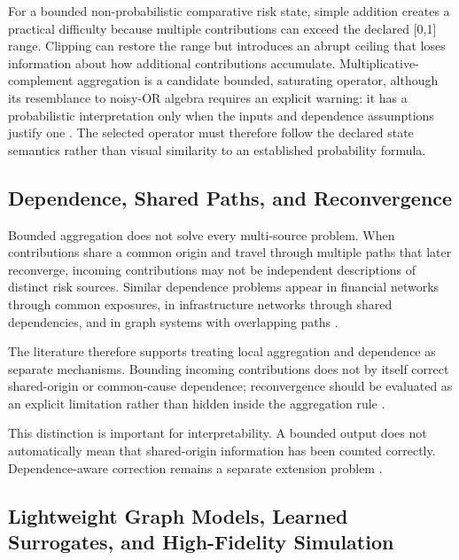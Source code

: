 For a bounded non-probabilistic comparative risk state, simple addition
creates a practical difficulty because multiple contributions can exceed
the declared {[}0,1{]} range. Clipping can restore the range but introduces
an abrupt ceiling that loses information about how additional
contributions accumulate. Multiplicative-complement aggregation is a
candidate bounded, saturating operator, although its resemblance to
noisy-OR algebra requires an explicit warning: it has a probabilistic
interpretation only when the inputs and dependence assumptions justify
one \citep{munoz2017}. The selected operator must therefore follow the
declared state semantics rather than visual similarity to an established
probability formula.

\subsection{Dependence, Shared Paths, and
Reconvergence}\label{dependence-shared-paths-and-reconvergence}

Bounded aggregation does not solve every multi-source problem. When
contributions share a common origin and travel through multiple paths
that later reconverge, incoming contributions may not be independent
descriptions of distinct risk sources. Similar dependence problems
appear in financial networks through common exposures, in infrastructure
networks through shared dependencies, and in graph systems with
overlapping paths \citep{buldyrev2010,faraji2026,zhou2023}.

The literature therefore supports treating local aggregation and
dependence as separate mechanisms. Bounding incoming contributions does
not by itself correct shared-origin or common-cause dependence;
reconvergence should be evaluated as an explicit limitation rather than
hidden inside the aggregation rule \citep{buldyrev2010,faraji2026}.

This distinction is important for interpretability. A bounded output
does not automatically mean that shared-origin information has been
counted correctly. Dependence-aware correction remains a separate
extension problem \citep{munoz2017,faraji2026}.

\subsection{Lightweight Graph Models, Learned Surrogates, and
High-Fidelity
Simulation}\label{lightweight-graph-models-learned-surrogates-and-high-fidelity-simulation}

